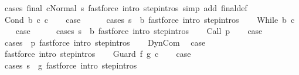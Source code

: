 \begin{isabellebody}
\ {\isacharparenleft}cases\ {\isachardoublequoteopen}final\ {\isacharparenleft}cNormal\ s{\isacharparenright}{\isachardoublequoteclose}{\isacharparenright}\ {\isacharparenleft}fastforce\ intro{\isacharcolon}\ step{\isachardot}intros\ simp\ add{\isacharcolon}\ final{\isacharunderscore}def{\isacharparenright}{\isacharplus}\isanewline
{}\isamarkupfalse%
\isanewline
\ \ \isamarkupfalse%
\ {\isacharparenleft}Cond\ b\ c{}\ c{}{\isacharparenright}\isanewline
\ \ \isamarkupfalse%
\ {\isacharquery}case\isanewline
\ \ \ \ \isamarkupfalse%
\ {\isacharparenleft}cases\ {\isachardoublequoteopen}s\ {\isasymin}\ b{\isachardoublequoteclose}{\isacharparenright}\ {\isacharparenleft}fastforce\ intro{\isacharcolon}\ step{\isachardot}intros{\isacharparenright}{\isacharplus}\isanewline
{}\isamarkupfalse%
\isanewline
\ \ \isamarkupfalse%
\ {\isacharparenleft}While\ b\ c{\isacharparenright}\isanewline
\ \ \isamarkupfalse%
\ {\isacharquery}case\isanewline
\ \ \ \ \isamarkupfalse%
\ {\isacharparenleft}cases\ {\isachardoublequoteopen}s\ {\isasymin}\ b{\isachardoublequoteclose}{\isacharparenright}\ {\isacharparenleft}fastforce\ intro{\isacharcolon}\ step{\isachardot}intros{\isacharparenright}{\isacharplus}\isanewline
{}\isamarkupfalse%
\isanewline
\ \ \isamarkupfalse%
\ {\isacharparenleft}Call\ p{\isacharparenright}\isanewline
\ \ \isamarkupfalse%
\ {\isacharquery}case\isanewline
\ \ \isamarkupfalse%
\ {\isacharparenleft}cases\ {\isachardoublequoteopen}{\isasymGamma}\ p{\isachardoublequoteclose}{\isacharparenright}\ {\isacharparenleft}fastforce\ intro{\isacharcolon}\ step{\isachardot}intros{\isacharparenright}{\isacharplus}\isanewline
{}\isamarkupfalse%
\isanewline
\ \ \isamarkupfalse%
\ DynCom\ \isamarkupfalse%
\ {\isacharquery}case\ \isamarkupfalse%
\ {\isacharparenleft}fastforce\ intro{\isacharcolon}\ step{\isachardot}intros{\isacharparenright}\isanewline
{}\isamarkupfalse%
\isanewline
\ \ \isamarkupfalse%
\ {\isacharparenleft}Guard\ f\ g\ c{\isacharparenright}\isanewline
\ \ \isamarkupfalse%
\ {\isacharquery}case\isanewline
\ \ \ \ \isamarkupfalse%
\ {\isacharparenleft}cases\ {\isachardoublequoteopen}s\ {\isasymin}\ g{\isachardoublequoteclose}{\isacharparenright}\ {\isacharparenleft}fastforce\ intro{\isacharcolon}\ step{\isachardot}intros{\isacharparenright}{\isacharplus}\isanewline

\end{isabellebody}
